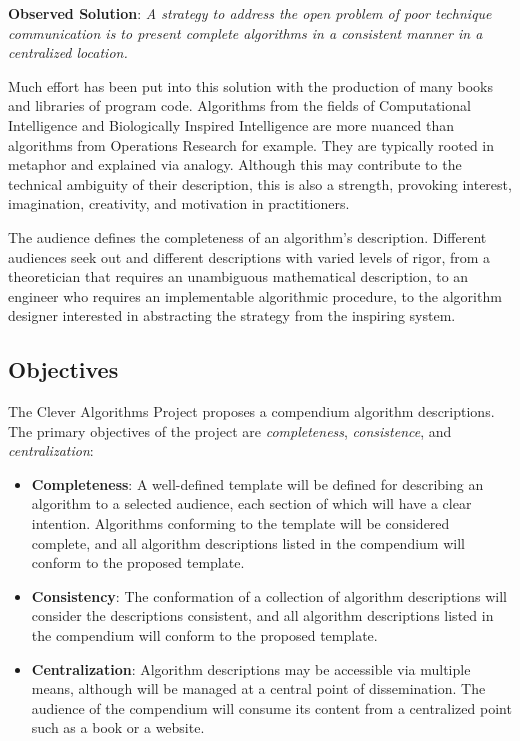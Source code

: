 \documentclass[a4paper, 11pt]{article}
\begin{document}
\textbf{Observed Solution}: \emph{A strategy to address the open problem of poor technique communication is to present complete algorithms in a consistent manner in a centralized location.} 

Much effort has been put into this solution with the production of many books and libraries of program code. Algorithms from the fields of Computational Intelligence and Biologically Inspired Intelligence are more nuanced than algorithms from Operations Research for example. They are typically rooted in metaphor and explained via analogy. Although this may contribute to the technical ambiguity of their description, this is also a strength, provoking interest, imagination, creativity, and motivation in practitioners. 

The audience defines the completeness of an algorithm's description. Different audiences seek out and different descriptions with varied levels of rigor, from a theoretician that requires an unambiguous mathematical description, to an engineer who requires an implementable algorithmic procedure, to the algorithm designer interested in abstracting the strategy from the inspiring system. 

\subsection{Objectives}

The Clever Algorithms Project proposes a compendium algorithm descriptions. The primary objectives of the project are \emph{completeness}, \emph{consistence}, and \emph{centralization}:

\begin{itemize}
	\item \textbf{Completeness}: A well-defined template will be defined for describing an algorithm to a selected audience, each section of which will have a clear intention. Algorithms conforming to the template will be considered complete, and all algorithm descriptions listed in the compendium will conform to the proposed template.
	\item \textbf{Consistency}: The conformation of a collection of algorithm descriptions will consider the descriptions consistent, and all algorithm descriptions listed in the compendium will conform to the proposed template.
	\item \textbf{Centralization}: Algorithm descriptions may be accessible via multiple means, although will be managed at a central point of dissemination. The audience of the compendium will consume its content from a centralized point such as a book or a website.
\end{itemize}
\end{document}
